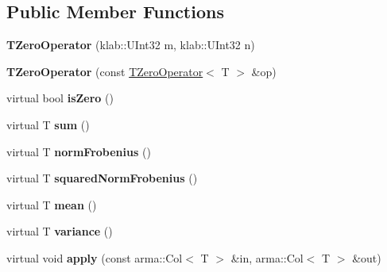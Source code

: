 \subsection*{Public Member Functions}
\begin{DoxyCompactItemize}
\item 
{\bfseries T\+Zero\+Operator} (klab\+::\+U\+Int32 m, klab\+::\+U\+Int32 n)\hypertarget{classkl1p_1_1TZeroOperator_a4eae212323a79dae362e35328bdfd7a4}{}\label{classkl1p_1_1TZeroOperator_a4eae212323a79dae362e35328bdfd7a4}

\item 
{\bfseries T\+Zero\+Operator} (const \hyperlink{classkl1p_1_1TZeroOperator}{T\+Zero\+Operator}$<$ T $>$ \&op)\hypertarget{classkl1p_1_1TZeroOperator_ae4e3210e3849b64608789bcaae34466c}{}\label{classkl1p_1_1TZeroOperator_ae4e3210e3849b64608789bcaae34466c}

\item 
virtual bool {\bfseries is\+Zero} ()\hypertarget{classkl1p_1_1TZeroOperator_addf6b449520eecefc66958fdca082aeb}{}\label{classkl1p_1_1TZeroOperator_addf6b449520eecefc66958fdca082aeb}

\item 
virtual T {\bfseries sum} ()\hypertarget{classkl1p_1_1TZeroOperator_a001f329f28e0ea8b52f56c4f67c06ea1}{}\label{classkl1p_1_1TZeroOperator_a001f329f28e0ea8b52f56c4f67c06ea1}

\item 
virtual T {\bfseries norm\+Frobenius} ()\hypertarget{classkl1p_1_1TZeroOperator_a25945c27aa1b4a8f4ea0ab53533d6641}{}\label{classkl1p_1_1TZeroOperator_a25945c27aa1b4a8f4ea0ab53533d6641}

\item 
virtual T {\bfseries squared\+Norm\+Frobenius} ()\hypertarget{classkl1p_1_1TZeroOperator_a944399ec18d4489cc77e17f496d41d8f}{}\label{classkl1p_1_1TZeroOperator_a944399ec18d4489cc77e17f496d41d8f}

\item 
virtual T {\bfseries mean} ()\hypertarget{classkl1p_1_1TZeroOperator_affa5e628f246108bbb6c23343f50ec7d}{}\label{classkl1p_1_1TZeroOperator_affa5e628f246108bbb6c23343f50ec7d}

\item 
virtual T {\bfseries variance} ()\hypertarget{classkl1p_1_1TZeroOperator_a50c4bbbb1f36ae00b5e46f5c309dabe8}{}\label{classkl1p_1_1TZeroOperator_a50c4bbbb1f36ae00b5e46f5c309dabe8}

\item 
virtual void {\bfseries apply} (const arma\+::\+Col$<$ T $>$ \&in, arma\+::\+Col$<$ T $>$ \&out)\hypertarget{classkl1p_1_1TZeroOperator_a12c2d1e7b2940a634fc744cb558e029e}{}\label{classkl1p_1_1TZeroOperator_a12c2d1e7b2940a634fc744cb558e029e}


\end{DoxyCompactItemize}
